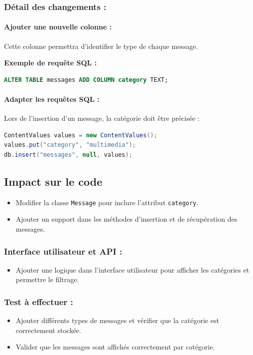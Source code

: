 \documentclass[a4paper,11pt]{article}
\begin{document}
\subsubsection*{Détail des changements :}

\paragraph{Ajouter une nouvelle colonne :}
Cette colonne permettra d'identifier le type de chaque message.

\textbf{Exemple de requête SQL :}
\begin{lstlisting}[language=SQL]
ALTER TABLE messages ADD COLUMN category TEXT;
\end{lstlisting}

\paragraph{Adapter les requêtes SQL :}
Lors de l'insertion d'un message, la catégorie doit être précisée :
\begin{lstlisting}[language=Java]
ContentValues values = new ContentValues();
values.put("category", "multimedia");
db.insert("messages", null, values);
\end{lstlisting}

\subsection*{Impact sur le code}
\begin{itemize}
    \item Modifier la classe \texttt{Message} pour inclure l'attribut \texttt{category}.
    \item Ajouter un support dans les méthodes d'insertion et de récupération des messages.
\end{itemize}

\subsubsection*{Interface utilisateur et API :}
\begin{itemize}
    \item Ajouter une logique dans l’interface utilisateur pour afficher les catégories et permettre le filtrage.
\end{itemize}

\subsubsection*{Test à effectuer :}
\begin{itemize}
    \item Ajouter différents types de messages et vérifier que la catégorie est correctement stockée.
    \item Valider que les messages sont affichés correctement par catégorie.
\end{itemize}
\end{document}
